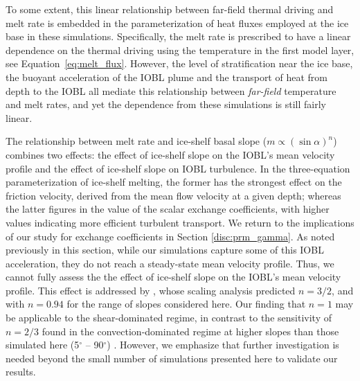 \documentclass[draft]{agujournal2019}
\begin{document}
To some extent, this linear relationship between far-field thermal driving and melt rate is embedded in the parameterization of heat fluxes employed at the ice base in these simulations. Specifically, the melt rate is prescribed to have a linear dependence on the thermal driving using the temperature in the first model layer, see Equation~\ref{eq:melt_flux}. However, the level of stratification near the ice base, the buoyant acceleration of the IOBL plume and the transport of heat from depth to the IOBL all mediate this relationship between \textit{far-field} temperature and melt rates, and yet the dependence from these simulations is still fairly linear.  

The relationship between melt rate and ice-shelf basal slope ($m \propto (\sin\alpha)^{n}$) combines two effects: the effect of ice-shelf slope on the IOBL's mean velocity profile and the effect of ice-shelf slope on IOBL turbulence. In the three-equation parameterization of ice-shelf melting, the former has the strongest effect on the friction velocity, derived from the mean flow velocity at a given depth; whereas the latter figures in the value of the scalar exchange coefficients, with higher values indicating more efficient turbulent transport. We return to the implications of our study for exchange coefficients in Section \ref{disc:prm_gamma}. As noted previously in this section, while our simulations capture some of this IOBL acceleration, they do not reach a steady-state mean velocity profile. Thus, we cannot fully assess the the effect of ice-shelf slope on the IOBL's mean velocity profile. This effect is addressed by , whose scaling analysis predicted $n=3/2$, and  with $n=0.94$ for the range of slopes considered here. Our finding that $n=1$ may be applicable to the shear-dominated regime, in contrast to the sensitivity of $n=2/3$ found in the convection-dominated regime at higher slopes than those simulated here (5$^{\circ}$ -- 90$^{\circ}$) \cite{mondal_ablation_2019, mcconnochie_dissolution_2018}. However, we emphasize that further investigation is needed beyond the small number of simulations presented here to validate our results. 
\end{document}
